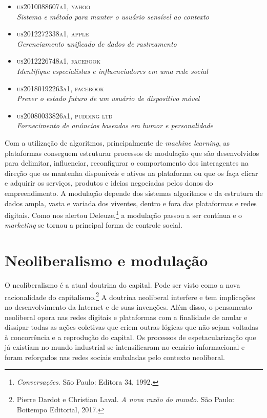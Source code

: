 \begin{itemize}
\item
  \textsc{us2010088607a1, yahoo}\\
  \textit{Sistema e método para manter o usuário sensível ao contexto}
\item
  \textsc{us2012272338a1, apple}\\
  \textit{Gerenciamento unificado de dados de rastreamento}
\item
  \textsc{us2012226748a1, facebook}\\
  \emph{Identifique especialistas e influenciadores em uma rede social}
\item
  \textsc{us20180192263a1, facebook}\\
  \emph{Prever o estado futuro de um usuário de dispositivo móvel}
\item
  \textsc{us20080033826a1, pudding ltd}\\
  \emph{Fornecimento de anúncios baseados em humor e personalidade}
\end{itemize}

Com a utilização de algoritmos, principalmente de \emph{machine
learning}, as plataformas conseguem estruturar processos de modulação
que são desenvolvidos para delimitar, influenciar, reconfigurar o
comportamento dos interagentes na direção que os mantenha disponíveis e
ativos na plataforma ou que os faça clicar e adquirir os serviços,
produtos e ideias negociadas pelos donos do empreendimento. A modulação
depende dos sistemas algoritmos e da estrutura de dados ampla, vasta e
variada dos viventes, dentro e fora das plataformas e redes digitais.
Como nos alertou Deleuze,\footnote{\emph{Conversações}. São Paulo:
Editora 34, 1992.} a modulação passou a ser contínua e o
\emph{marketing} se tornou a principal forma de controle social.

\section{Neoliberalismo e modulação}

O neoliberalismo é a atual doutrina do capital. Pode ser visto como a
nova racionalidade do capitalismo.\footnote{Pierre Dardot e Christian Laval. \emph{A nova razão do mundo}. São Paulo: Boitempo Editorial, 2017.} A doutrina
neoliberal interfere e tem implicações no desenvolvimento da Internet e
de suas invenções. Além disso, o pensamento neoliberal opera nas redes
digitais e plataformas com a finalidade de anular e dissipar todas as
ações coletivas que criem outras lógicas que não sejam voltadas à
concorrência e a reprodução do capital. Os processos de
espetacularização que já existiam no mundo industrial se intensificaram
no cenário informacional e foram reforçados nas redes sociais embaladas
pelo contexto neoliberal.

